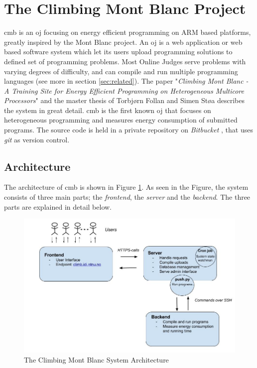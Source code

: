 \section{The Climbing Mont Blanc Project}
\label{sec:cmb}
\gls{cmb} is an \gls{oj} focusing on energy efficient programming on ARM based platforms, greatly inspired by the Mont Blanc project. An \gls{oj} is a web application or web based software system which let its users upload programming solutions to defined set of programming problems. Most Online Judges serve problems with varying degrees of difficulty, and can compile and run multiple programming languages (see more in section \ref{sec:related}). The paper "\textit{Climbing Mont Blanc - A Training Site for Energy Efficient Programming on Heterogeneous Multicore Processors}" \cite{a:CMB} and the master thesis of Torbjørn Follan and Simen Støa \cite{mt:T&S} describes the system in great detail. \gls{cmb} is the first known \gls{oj} that focuses on heterogeneous programming and measures energy consumption of submitted programs. The source code is held in a private repository on \textit{Bitbucket} \cite{BITBUCKET}, that uses \textit{git} \cite{GIT} as version control.

\subsection{Architecture}
\label{subsec:cmb-arch}
The architecture of \gls{cmb} is shown in Figure \ref{fig:cmb_arch}. As seen in the Figure, the system consists of three main parts; the \textit{frontend}, the \textit{server} and the \textit{backend}. The three parts are explained in detail below.

\begin{figure}
  \includegraphics[width=1.0\textwidth]{figs/cmb_arch.jpg}
  \caption[The Climbing Mont Blanc System Architecture]{The Climbing Mont Blanc System Architecture}
  \label{fig:cmb_arch}
\end{figure}

